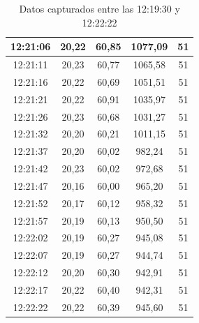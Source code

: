 \documentclass{templateNote}
\begin{document}
\begin{table}[H]
\begin{tabular}{|c|c|c|c|c|}
            12:21:06 & 20,22     & 60,85     & 1077,09   & 51        \\ \hline
            12:21:11 & 20,23     & 60,77     & 1065,58   & 51        \\ \hline
            12:21:16 & 20,22     & 60,69     & 1051,51   & 51        \\ \hline
            12:21:21 & 20,22     & 60,91     & 1035,97   & 51        \\ \hline
            12:21:26 & 20,23     & 60,68     & 1031,27   & 51        \\ \hline
            12:21:32 & 20,20     & 60,21     & 1011,15   & 51        \\ \hline
            12:21:37 & 20,20     & 60,02     & 982,24    & 51        \\ \hline
            12:21:42 & 20,23     & 60,02     & 972,68    & 51        \\ \hline
            12:21:47 & 20,16     & 60,00     & 965,20    & 51        \\ \hline
            12:21:52 & 20,17     & 60,12     & 958,32    & 51        \\ \hline
            12:21:57 & 20,19     & 60,13     & 950,50    & 51        \\ \hline
            12:22:02 & 20,19     & 60,27     & 945,08    & 51        \\ \hline
            12:22:07 & 20,19     & 60,27     & 944,74    & 51        \\ \hline
            12:22:12 & 20,20     & 60,30     & 942,91    & 51        \\ \hline
            12:22:17 & 20,22     & 60,40     & 942,31    & 51        \\ \hline
            12:22:22 & 20,22     & 60,39     & 945,60    & 51        \\ \hline
        \end{tabular}
        \caption{Datos capturados entre las 12:19:30 y 12:22:22}
        \label{tab:data2}
\end{table}
\end{document}
